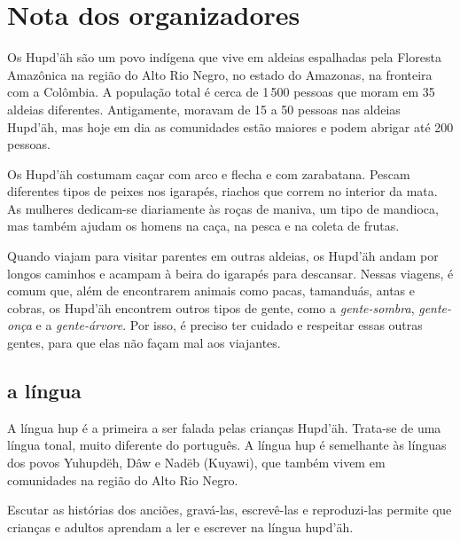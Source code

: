 \chapter{Nota dos organizadores}

Os Hupd’äh são um povo indígena que vive em aldeias espalhadas pela Floresta Amazônica na região do Alto Rio Negro, no estado do Amazonas, na fronteira com a Colômbia. A população total é cerca de 1\,500 pessoas que moram em 35 aldeias diferentes. Antigamente, moravam de 15 a 50 pessoas nas aldeias Hupd’äh, mas hoje em dia as comunidades estão maiores e podem abrigar até 200 pessoas.

Os Hupd’äh costumam caçar com arco e flecha e com zarabatana. Pescam diferentes tipos de peixes nos igarapés, riachos que correm no interior da mata. As mulheres dedicam-se diariamente às roças de maniva, um tipo de mandioca, mas também ajudam os homens na caça, na pesca e na coleta de frutas.

Quando viajam para visitar parentes em outras aldeias, os Hupd’äh andam por longos caminhos e acampam à beira do igarapés para descansar. Nessas viagens, é comum que, além de encontrarem animais como pacas, tamanduás, antas e cobras, os Hupd’äh encontrem outros tipos de gente, como a \textit{gente-sombra}, \textit{gente-onça} e a \textit{gente-árvore}. Por isso, é preciso ter cuidado e respeitar essas outras gentes, para que elas não façam mal aos viajantes.

\section{a língua}

A língua hup é a primeira a ser falada pelas crianças Hupd’äh. Trata-se de uma língua tonal, muito
diferente do português. A língua hup é semelhante às línguas dos povos Yuhupdëh,
Dâw e Nadëb (Kuyawi), que também vivem em comunidades na região do Alto Rio Negro.


Escutar as histórias dos anciões, gravá-las, escrevê-las e reproduzi-las permite que
crianças e adultos aprendam a ler e escrever na língua hupd’äh.

